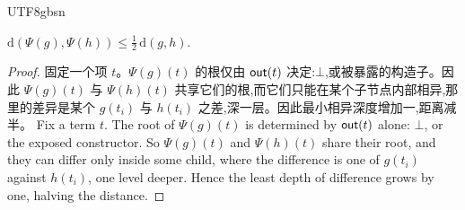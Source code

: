 \begin{CJK*}{UTF8}{gbsn}
  \begin{lemma}\label{lem:guarded}
    $\mathrm{d}(\Psi(g), \Psi(h)) \le \tfrac{1}{2}\,\mathrm{d}(g, h)$.
  \end{lemma}
  \begin{proof}
    \ifTablambdaChinese
    固定一个项 $t$。$\Psi(g)(t)$ 的根仅由 $\mathsf{out}(t)$ 决定:$\bot$,或被暴露的构造子。因此 $\Psi(g)(t)$ 与 $\Psi(h)(t)$ 共享它们的根,而它们只能在某个子节点内部相异,那里的差异是某个 $g(t_i)$ 与 $h(t_i)$ 之差,深一层。因此最小相异深度增加一,距离减半。
    \else
    Fix a term $t$. The root of $\Psi(g)(t)$ is determined by $\mathsf{out}(t)$ alone: $\bot$, or the exposed constructor. So $\Psi(g)(t)$ and $\Psi(h)(t)$ share their root, and they can differ only inside some child, where the difference is one of $g(t_i)$ against $h(t_i)$, one level deeper. Hence the least depth of difference grows by one, halving the distance.
    \fi
  \end{proof}


\end{CJK*}
